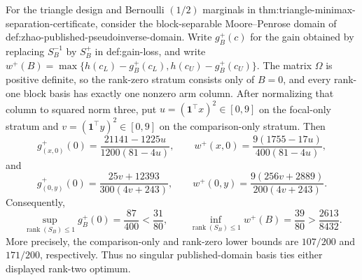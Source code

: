 For the triangle design and Bernoulli \((1/2)\) marginals in thm:triangle-minimax-separation-certificate, consider the block-separable Moore--Penrose domain of def:zhao-published-pseudoinverse-domain.  Write \(g_B^{+}(c)\) for the gain obtained by replacing \(S_B^{-1}\) by \(S_B^{+}\) in def:gain-loss, and write \(w^{+}(B)=\max\{h(c_L)-g_B^{+}(c_L),h(c_U)-g_B^{+}(c_U)\}\).  The matrix \(\Omega\) is positive definite, so the rank-zero stratum consists only of \(B=0\), and every rank-one block basis has exactly one nonzero arm column.  After normalizing that column to squared norm three, put \(u=(\mathbf1^{\top}x)^2\in[0,9]\) on the focal-only stratum and \(v=(\mathbf1^{\top}y)^2\in[0,9]\) on the comparison-only stratum.  Then
\[
g_{(x,0)}^{+}(0)=\frac{21141-1225u}{1200(81-4u)},
\qquad
w^{+}(x,0)=\frac{9(1755-17u)}{400(81-4u)},
\]
and
\[
g_{(0,y)}^{+}(0)=\frac{25v+12393}{300(4v+243)},
\qquad
w^{+}(0,y)=\frac{9(256v+2889)}{200(4v+243)}.
\]
Consequently,
\[
\sup_{\operatorname{rank}(S_B)\le1}g_B^{+}(0)=\frac{87}{400}<\frac{31}{80},
\qquad
\inf_{\operatorname{rank}(S_B)\le1}w^{+}(B)=\frac{39}{80}>\frac{2613}{8432}.
\]
More precisely, the comparison-only and rank-zero lower bounds are \(107/200\) and \(171/200\), respectively.  Thus no singular published-domain basis ties either displayed rank-two optimum.